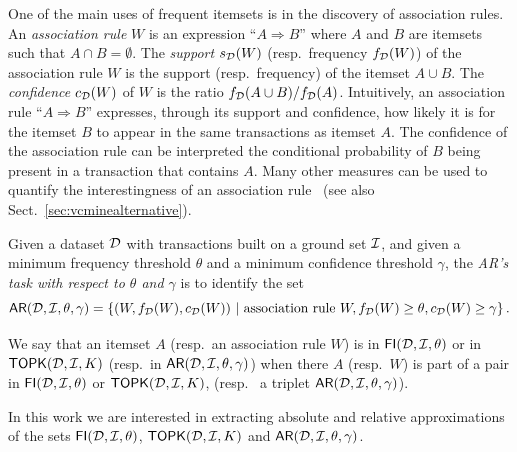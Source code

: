 One of the main uses of frequent itemsets is in the discovery of
association rules.
An \emph{association rule} $W$ is an expression
  ``$A\Rightarrow B$'' where $A$ and $B$ are itemsets such that $A\cap
  B=\emptyset$. The \emph{support} $s_{\cal D}(W)$ (resp.~frequency $f_{\cal D}(W)$)
  of the association rule $W$ is the support (resp.~frequency) of the itemset
  $A\cup B$. The \emph{confidence} $c_{\cal D}(W)$ of $W$ is the ratio $f_{\cal D}(A \cup
  B)/f_{\cal D}(A)$. %
Intuitively, an association rule ``$A\Rightarrow B$'' expresses, through its
support and confidence, how likely it is for the itemset $B$ to appear in the
same transactions as itemset $A$. The confidence of the association rule
can be interpreted the conditional probability of $B$ being present in a transaction that 
contains $A$. Many other measures can be used to quantify the interestingness of
an association rule~\cite{TanKS04} (see also Sect.~\ref{sec:vcminealternative}).

\begin{definition}\label{def:vcmineminear}
  Given a dataset ${\cal D}$ with transactions
  built on a ground set ${\cal I}$, and given a minimum frequency threshold $\theta$
  and a minimum confidence threshold $\gamma$, the \emph{AR's task with respect
  to $\theta$ and $\gamma$} is to identify the set
  \[
  \mathsf{AR}({\cal D},{\cal I},\theta,\gamma)=\left\{(W,f_{\cal D}(W),c_{\cal D}(W)) ~|~ \mbox{association rule } W,
  f_{\cal D}(W)\ge\theta, c_{\cal D}(W)\ge\gamma\right\}.\]
\end{definition}

We say that an itemset $A$ (resp.~an
association rule $W$) is in $\mathsf{FI}({\cal D},{\cal I},\theta)$ or in $\mathsf{TOPK}({\cal D},{\cal I},K)$
(resp.~in $\mathsf{AR}({\cal D},{\cal I},\theta,\gamma)$) 
when there $A$ (resp.~$W$) is part of a pair in $\mathsf{FI}({\cal D},{\cal I},\theta)$ or
$\mathsf{TOPK}({\cal D},{\cal I},K)$, (resp.~ a triplet $\mathsf{AR}({\cal D},{\cal I},\theta,\gamma)$).

In this work we are interested in extracting absolute and relative
approximations of the sets $\mathsf{FI}({\cal D},{\cal I},\theta)$, $\mathsf{TOPK}({\cal D},{\cal I},K)$ and
$\mathsf{AR}({\cal D},{\cal I},\theta,\gamma)$. 

